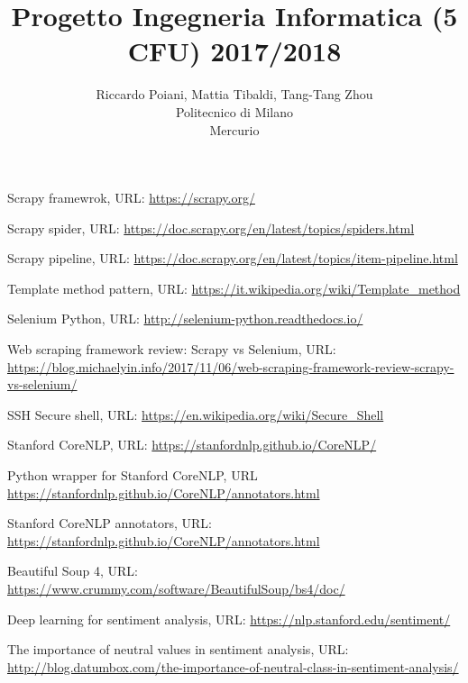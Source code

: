 \documentclass[a4paper]{article}
\begin{document}
\title{Progetto Ingegneria Informatica (5 CFU) 2017/2018}
\author{
        Riccardo Poiani, Mattia Tibaldi, Tang-Tang Zhou \\
        Politecnico di Milano\\  
        Mercurio              
}
\maketitle
\newpage
\tableofcontents
{}
\newpage





\clearpage
\begin{thebibliography}{9}
Scrapy framewrok, URL: \url{https://scrapy.org/}

Scrapy spider, URL: \url{https://doc.scrapy.org/en/latest/topics/spiders.html}

Scrapy pipeline, URL: \url{https://doc.scrapy.org/en/latest/topics/item-pipeline.html}

Template method pattern, URL: \url{https://it.wikipedia.org/wiki/Template_method}

Selenium Python, URL: \url{http://selenium-python.readthedocs.io/}

Web scraping framework review: Scrapy vs Selenium, URL: \url{https://blog.michaelyin.info/2017/11/06/web-scraping-framework-review-scrapy-vs-selenium/}

SSH Secure shell, URL: \url{https://en.wikipedia.org/wiki/Secure_Shell}

Stanford CoreNLP, URL: \url{https://stanfordnlp.github.io/CoreNLP/}

Python wrapper for Stanford CoreNLP, URL \url{https://stanfordnlp.github.io/CoreNLP/annotators.html}

Stanford CoreNLP annotators, URL: \url{https://stanfordnlp.github.io/CoreNLP/annotators.html}

Beautiful Soup 4, URL: \url{https://www.crummy.com/software/BeautifulSoup/bs4/doc/}

Deep learning for sentiment analysis, URL: \url{https://nlp.stanford.edu/sentiment/}

The importance of neutral values in sentiment analysis, URL: \url{http://blog.datumbox.com/the-importance-of-neutral-class-in-sentiment-analysis/}

\end{thebibliography}
\end{document}
